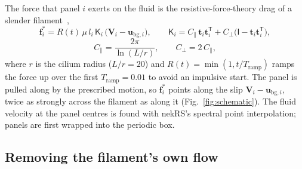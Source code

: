 \documentclass[10pt,a4paper]{article}
\newcommand{\vect}[1]{\bm{#1}}
\newcommand{\tens}[1]{\mathsf{#1}}
\begin{document}
The force that panel $i$ exerts on the fluid is the resistive-force-theory drag of a slender filament~\cite{GrayHancock1955,Lighthill1976},
\begin{equation}
  \vect f^{*}_i = R(t)\,\mu\, l_i\,\tens K_i\,\bigl(\vect V_i - \vect u_{\mathrm{bg},i}\bigr),
  \qquad
  \tens K_i = C_\parallel\,\vect t_i\vect t_i^{\mathsf T} + C_\perp\bigl(\tens I - \vect t_i\vect t_i^{\mathsf T}\bigr),
  \label{eq:rft}
\end{equation}
\begin{equation}
  C_\parallel = \frac{2\pi}{\ln(L/r)}, \qquad C_\perp = 2\,C_\parallel ,
\end{equation}
where $r$ is the cilium radius ($L/r = 20$) and $R(t) = \min(1, t/T_\mathrm{ramp})$ ramps the force up over the first $T_\mathrm{ramp} = 0.01$ to avoid an impulsive start.
The panel is pulled along by the prescribed motion, so $\vect f^*_i$ points along the slip $\vect V_i - \vect u_{\mathrm{bg},i}$, twice as strongly across the filament as along it (Fig.~\ref{fig:schematic}).
The fluid velocity at the panel centres is found with nekRS's spectral point interpolation; panels are first wrapped into the periodic box.

\subsection{Removing the filament's own flow}
\end{document}

